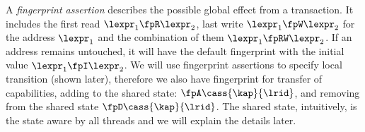 A \emph{fingerprint assertion} describes the possible global effect from a transaction.
It includes the first read \( \lexpr_{1} \fpR \lexpr_{2} \), last write \( \lexpr_{1} \fpW \lexpr_{2} \) for the address \( \lexpr_{1} \) and the combination of them \( \lexpr_{1} \fpRW \lexpr_{2} \).
If an address remains untouched, it will have the default fingerprint with the initial value \( \lexpr_{1} \fpI \lexpr_{2} \).
We will use fingerprint assertions to specify local transition (shown later), therefore we also have fingerprint for transfer of capabilities, \ie adding to the shared state: \( \fpA \cass{\kap}{\lrid} \), and removing from the shared state \( \fpD \cass{\kap}{\lrid} \).
The shared state, intuitively, is the state aware by all threads and we will explain the details later.


